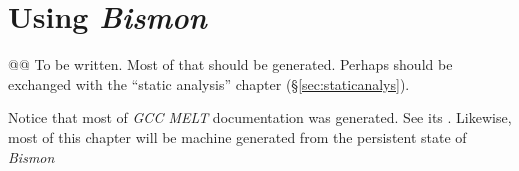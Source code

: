 \section{Using \emph{Bismon}}
\label{sec:using}

{\Large @@ To be written.} Most of that should be generated. Perhaps
should be exchanged with the ``static analysis'' chapter
(§\ref{sec:staticanalys}).

\bigskip

Notice that most of \emph{GCC MELT} documentation was generated. See its
{\small{}}. Likewise,
most of this chapter will be machine generated from the persistent
state of \emph{Bismon}
